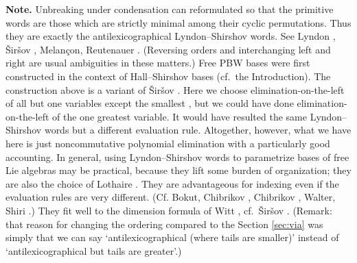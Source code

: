 \documentclass[11pt,a4paper]{amsart}
\newcommand{\snewpage}{}
\newcommand{\snewpage}{\newpage}
\newcommand{\snewpage}{}
\theoremstyle{definition}
\theoremstyle{plain}
\begin{document}
\textbf{Note.}
Unbreaking under condensation can reformulated so that
 the primitive words are those which are strictly minimal among their cyclic permutations.
Thus they are exactly the antilexicographical Lyndon--Shirshov words.
See Lyndon \cite{Lyn}, \v{S}ir\v{s}ov \cite{S2}, Melan\c{c}on,  Reutenauer  \cite{MR}.
(Reversing orders and interchanging left and right are usual ambiguities in these matters.)
Free PBW bases were first constructed in the context of Hall--Shirshov bases (cf.~the Introduction).
The construction above is a variant of \v{S}ir\v{s}ov \cite{S2}.
Here we choose elimination-on-the-left of all but one variables except the smallest , but we could have done
 elimination-on-the-left of the one greatest variable.
It would have resulted the same Lyndon--Shirshov words but a different evaluation rule.
Altogether, however, what we have here is just noncommutative polynomial elimination with a particularly good accounting.
In general, using Lyndon--Shirshov words to parametrize bases of free Lie algebras may be practical, because
 they lift some burden of organization; they are also the choice of Lothaire \cite{Lot}.
They are advantageous for indexing even if the evaluation rules are very different.
(Cf. Bokut, Chibrikov \cite{BCh}, Chibrikov \cite{Chb}, Walter, Shiri \cite{WS}.)
They fit well to the dimension formula of Witt \cite{W}, cf.~\v{S}ir\v{s}ov \cite{S2}.
(Remark: that reason for changing the ordering compared to the Section \ref{sec:via} was simply
 that we can say `antilexicographical (where tails are smaller)' instead of `antilexicographical but tails are greater'.)
\snewpage
\end{document}

